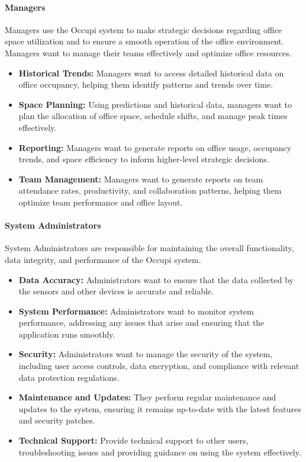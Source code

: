 \documentclass[11pt,a4paper]{article}
\begin{document}
\paragraph{Managers}
Managers use the Occupi system to make strategic decisions regarding office space utilization and to ensure a smooth operation of the office environment. Managers want to manage their teams effectively and optimize office resources.
\begin{itemize}
    \item \textbf{Historical Trends:} Managers want to access detailed historical data on office occupancy, helping them identify patterns and trends over time.
    \item \textbf{Space Planning:} Using predictions and historical data, managers want to plan the allocation of office space, schedule shifts, and manage peak times effectively.
    \item \textbf{Reporting:} Managers want to generate reports on office usage, occupancy trends, and space efficiency to inform higher-level strategic decisions.
    \item \textbf{Team Management:} Managers want to generate reports on team attendance rates, productivity, and collaboration patterns, helping them optimize team performance and office layout.
\end{itemize}

\paragraph{System Administrators}
System Administrators are responsible for maintaining the overall functionality, data integrity, and performance of the Occupi system.
\begin{itemize}
    \item \textbf{Data Accuracy:} Administrators want to ensure that the data collected by the sensors and other devices is accurate and reliable.
    \item \textbf{System Performance:} Administrators want to monitor system performance, addressing any issues that arise and ensuring that the application runs smoothly.
    \item \textbf{Security:} Administrators want to manage the security of the system, including user access controls, data encryption, and compliance with relevant data protection regulations.
    \item \textbf{Maintenance and Updates:} They perform regular maintenance and updates to the system, ensuring it remains up-to-date with the latest features and security patches.
    \item \textbf{Technical Support:} Provide technical support to other users, troubleshooting issues and providing guidance on using the system effectively.
\end{itemize}
\end{document}
